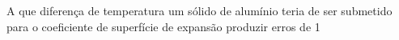 A que diferença de temperatura um sólido de alumínio teria de ser submetido para o coeficiente de superfície de expansão produzir erros de 1%

